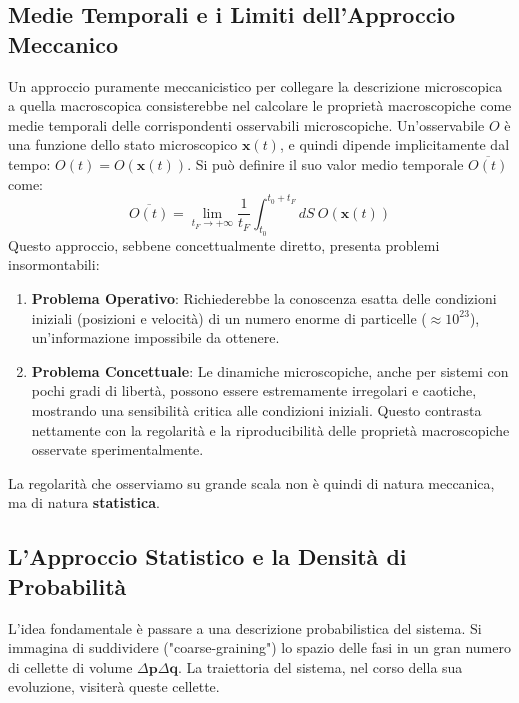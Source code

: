\subsection*{Medie Temporali e i Limiti dell'Approccio Meccanico}

Un approccio puramente meccanicistico per collegare la descrizione microscopica a quella macroscopica consisterebbe nel calcolare le proprietà macroscopiche come medie temporali delle corrispondenti osservabili microscopiche. Un'osservabile $O$ è una funzione dello stato microscopico $\mathbf{x}(t)$, e quindi dipende implicitamente dal tempo: $O(t) = O(\mathbf{x}(t))$. Si può definire il suo valor medio temporale $\overline{O(t)}$ come:
\begin{equation}
    \overline{O(t)}=\lim_{t_{F}\rightarrow+\infty}\frac{1}{t_{F}}\int_{t_{0}}^{t_{0}+t_{F}}dS~O(\mathbf{x}(t))
    \label{eq:media_temporale}
\end{equation}
Questo approccio, sebbene concettualmente diretto, presenta problemi insormontabili:
\begin{enumerate}
    \item \textbf{Problema Operativo}: Richiederebbe la conoscenza esatta delle condizioni iniziali (posizioni e velocità) di un numero enorme di particelle ($\approx 10^{23}$), un'informazione impossibile da ottenere.
    \item \textbf{Problema Concettuale}: Le dinamiche microscopiche, anche per sistemi con pochi gradi di libertà, possono essere estremamente irregolari e caotiche, mostrando una sensibilità critica alle condizioni iniziali. Questo contrasta nettamente con la regolarità e la riproducibilità delle proprietà macroscopiche osservate sperimentalmente.
\end{enumerate}
La regolarità che osserviamo su grande scala non è quindi di natura meccanica, ma di natura \textbf{statistica}.

\subsection*{L'Approccio Statistico e la Densità di Probabilità}

L'idea fondamentale è passare a una descrizione probabilistica del sistema. Si immagina di suddividere ("coarse-graining") lo spazio delle fasi in un gran numero di cellette di volume $\Delta\mathbf{p}\Delta\mathbf{q}$. La traiettoria del sistema, nel corso della sua evoluzione, visiterà queste cellette.


